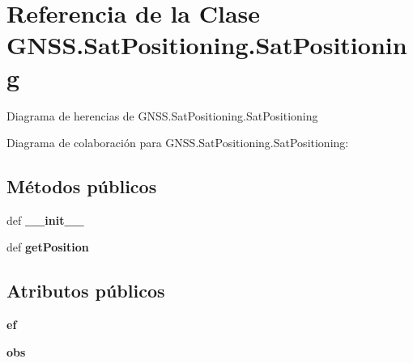 \section{Referencia de la Clase G\-N\-S\-S.\-Sat\-Positioning.\-Sat\-Positioning}
\label{classGNSS_1_1SatPositioning_1_1SatPositioning}


Diagrama de herencias de G\-N\-S\-S.\-Sat\-Positioning.\-Sat\-Positioning


Diagrama de colaboración para G\-N\-S\-S.\-Sat\-Positioning.\-Sat\-Positioning\-:
\subsection*{Métodos públicos}
\begin{DoxyCompactItemize}
\item 
def {\bf \-\_\-\-\_\-init\-\_\-\-\_\-}
\item 
def {\bf get\-Position}
\end{DoxyCompactItemize}
\subsection*{Atributos públicos}
\begin{DoxyCompactItemize}
\item 
{\bf ef}
\item 
{\bf obs}
\end{DoxyCompactItemize}

